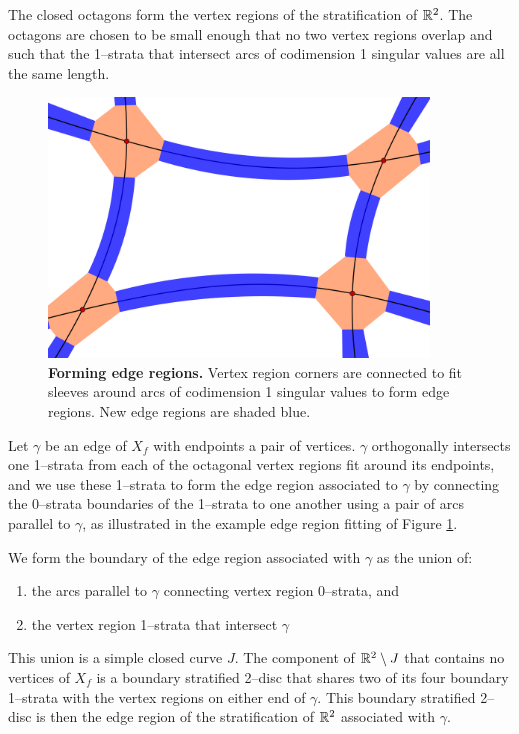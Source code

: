 The closed octagons form the vertex regions of the stratification of $\mathbb{R}^2$.
The octagons are chosen to be small enough that no two vertex regions overlap and such that the 1--strata that intersect arcs of codimension 1 singular values are all the same length.

\begin{figure}[h!]
	\centering
	\includegraphics[width=0.9\textwidth]{figures/edge-sleeve.png}
	\caption{
		\textbf{Forming edge regions.}
		Vertex region corners are connected to fit sleeves around arcs of codimension 1 singular values to form edge regions.
		New edge regions are shaded blue.
	}
	\label{fig:edge-sleeve}
\end{figure}

Let $\gamma$ be an edge of $X_f$ with endpoints a pair of vertices.
$\gamma$ orthogonally intersects one 1--strata from each of the octagonal vertex regions fit around its endpoints, and we use these 1--strata to form the edge region associated to $\gamma$ by connecting the 0--strata boundaries of the 1--strata to one another using a pair of arcs parallel to $\gamma$, as illustrated in the example edge region fitting of Figure \ref{fig:edge-sleeve}.

We form the boundary of the edge region associated with $\gamma$ as the union of:
\begin{enumerate}
	\item the arcs parallel to $\gamma$ connecting vertex region 0--strata, and
	\item the vertex region 1--strata that intersect $\gamma$
\end{enumerate}
This union is a simple closed curve $J$.
The component of $\mathbb{R}^2\setminus J$ that contains no vertices of $X_f$ is a boundary stratified 2--disc that shares two of its four boundary 1--strata with the vertex regions on either end of $\gamma$.
This boundary stratified 2--disc is then the edge region of the stratification of $\mathbb{R}^2$ associated with $\gamma$.

